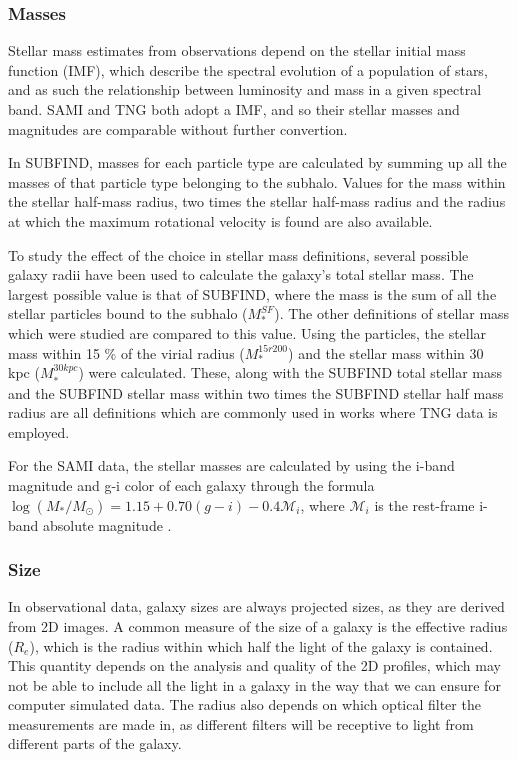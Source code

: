 \subsubsection{Masses}

Stellar mass estimates from observations depend on the stellar initial mass function (IMF), which describe the spectral evolution of a population of stars, and as such the relationship between luminosity and mass in a given spectral band. SAMI and TNG both adopt a \textcite{Chabrier2003} IMF, and so their stellar masses and magnitudes are comparable without further convertion.

In SUBFIND, masses for each particle type are calculated by summing up all the masses of that particle type belonging to the subhalo. Values for the mass within the stellar half-mass radius, two times the stellar half-mass radius and the radius at which the maximum rotational velocity is found are also available.

To study the effect of the choice in stellar mass definitions, several possible galaxy radii have been used to calculate the galaxy's total stellar mass. The largest possible value is that of SUBFIND, where the mass is the sum of all the stellar particles bound to the subhalo ($M^{SF}_\ast$). The other definitions of stellar mass which were studied are compared to this value. Using the particles, the stellar mass within 15 \% of the virial radius ($M_\ast^{15r200}$) and the stellar mass within 30$\,$ kpc ($M_\ast^{30kpc}$) were calculated. These, along with the SUBFIND total stellar mass and the SUBFIND stellar mass within two times the SUBFIND stellar half mass radius are all definitions which are commonly used in works where TNG data is employed. 

For the SAMI data, the stellar masses are calculated by using the i-band magnitude and g-i color of each galaxy through the formula $\log(M_*/M_\odot) = 1.15 + 0.70(g-i) -0.4\mathcal{M}_i$, where $\mathcal{M}_i$ is the rest-frame i-band absolute magnitude \parencite{Taylor2011}.

\subsubsection{Size}

In observational data, galaxy sizes are always projected sizes, as they are derived from 2D images. A common measure of the size of a galaxy is the effective radius ($R_e$), which is the radius within which half the light of the galaxy is contained. This quantity depends on the analysis and quality of the 2D profiles, which may not be able to include all the light in a galaxy in the way that we can ensure for computer simulated data. The radius also depends on which optical filter the measurements are made in, as different filters will be receptive to light from different parts of the galaxy. 

